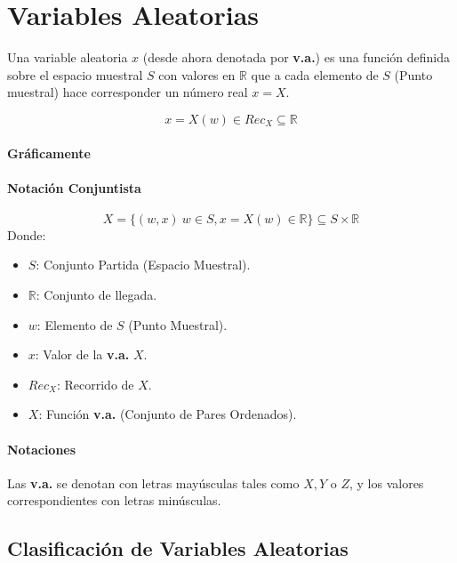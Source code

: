 \chapter{Variables Aleatorias}
Una variable aleatoria $x$ (desde ahora denotada por \textbf{v.a.}) es una función definida sobre el espacio muestral $S$ con valores en $\mathbb{R}$ que a cada elemento de $S$ (Punto muestral) hace corresponder un número real $x=X$.

$$x=X(w) \in Rec_X \subseteq \mathbb{R}$$ 
\subsubsection{Gráficamente}
\subsubsection{Notación Conjuntista}
$$X = \lbrace (w,x)\ w\in S, x=X(w)\in \mathbb{R} \rbrace \subseteq S\times  \mathbb{R}$$
Donde:
\begin{itemize}
\item $S$: Conjunto Partida (Espacio Muestral).
\item $\mathbb{R}$: Conjunto de llegada.
\item $w$: Elemento de $S$ (Punto Muestral).
\item $x$: Valor de la \textbf{v.a.} $X$.
\item $Rec_X$: Recorrido de $X$.
\item $X$: Función \textbf{v.a.} (Conjunto de Pares Ordenados).
\end{itemize}
\subsubsection{Notaciones}
Las \textbf{v.a.} se denotan con letras mayúsculas tales como $X,Y$ o $Z$, y los valores correspondientes con letras minúsculas.
\section{Clasificación de Variables Aleatorias}